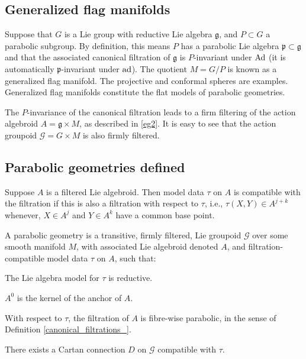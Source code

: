 \documentclass[leqno,12pt]{amsart} %
\begin{document}
\subsection{Generalized flag manifolds}\label{parabolic_}
Suppose that $G$ is a Lie group with reductive Lie algebra $\mathfrak g$, and
$P \subset G$ a parabolic subgroup. By definition, this means $P$ has a parabolic Lie
algebra ${\mathfrak p} \subset {\mathfrak g} $ and that the associated canonical
filtration of ${\mathfrak g} $ is $P$-invariant under $\operatorname{Ad}$ (it is automatically
${\mathfrak p} $-invariant under $\operatorname{ad}$). The quotient $M=G/P$ is known as a {\df
  generalized flag manifold}. The projective and conformal spheres are
examples. Generalized flag manifolds constitute the flat models of parabolic geometries.

The $P$-invariance of the canonical filtration leads to a firm filtering of the action
algebroid $A = {\mathfrak g} \times M$, as described in \ref{eg2}. It is easy to see that
the action groupoid ${\mathcal G} = G \times M $ is also firmly filtered.

\subsection{Parabolic geometries defined}\label{parabolic_defined}
Suppose $A$ is a filtered Lie algebroid. Then model data $\tau$ on $A$ is {\df compatible}
with the filtration if this is also a filtration with respect to $\tau$, i.e.,
$\tau(X, Y) \in A^{j+k}$ whenever, $X \in A^j$ and $Y \in A^k$ have a common base
point.

A {\df parabolic geometry} is a transitive, firmly filtered, Lie groupoid ${\mathcal G} $
over some smooth manifold $M$, with associated Lie algebroid denoted $A$, and
filtration-compatible model data $\tau $ on $A$, such that:
\begin{conditions}
    \item[{\bf P1.}] The Lie algebra model for $\tau $ is reductive.\label{parabolic2}
    \item[{\bf P2.}] $A^0$ is the kernel of the anchor of $A$. \label{parabolic0}
    \item[{\bf P3.}] With respect to $\tau $, the filtration of $A$ is fibre-wise
      parabolic, in the sense of Definition
      \ref{canonical_filtrations_}. \label{parabolic1}
    \item[{\bf P4.}] There exists a Cartan connection $D$ on ${\mathcal G} $
      compatible with $\tau $.\label{parabolic4}
\end{conditions}
%
\end{document}

